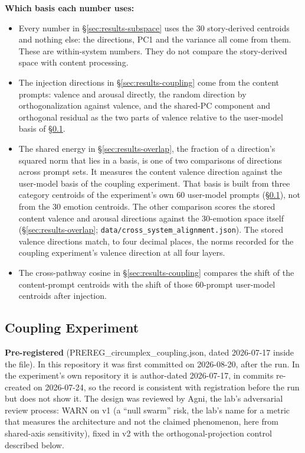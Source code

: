 \documentclass[11pt,a4paper]{article}
\begin{document}
\textbf{Which basis each number uses:}
\begin{itemize}
  \item Every number in \S\ref{sec:results-subspace} uses the 30 story-derived centroids and nothing else: the directions, PC1 and the variance all come from them. These are within-system numbers. They do not compare the story-derived space with content processing.
  \item The injection directions in \S\ref{sec:results-coupling} come from the content prompts: valence and arousal directly, the random direction by orthogonalization against valence, and the shared-PC component and orthogonal residual as the two parts of valence relative to the user-model basis of \S\ref{sec:coupling}.
  \item The shared energy in \S\ref{sec:results-overlap}, the fraction of a direction's squared norm that lies in a basis, is one of two comparisons of directions across prompt sets. It measures the content valence direction against the user-model basis of the coupling experiment. That basis is built from three category centroids of the experiment's own 60 user-model prompts (\S\ref{sec:coupling}), not from the 30 emotion centroids. The other comparison scores the stored content valence and arousal directions against the 30-emotion space itself (\S\ref{sec:results-overlap}; \texttt{data/\allowbreak cross\_system\_alignment.json}). The stored valence directions match, to four decimal places, the norms recorded for the coupling experiment's valence direction at all four layers.
  \item The cross-pathway cosine in \S\ref{sec:results-coupling} compares the shift of the content-prompt centroids with the shift of those 60-prompt user-model centroids after injection.
\end{itemize}

\subsection{Coupling Experiment}
\label{sec:coupling}

\textbf{Pre-registered} (PREREG\_circumplex\_coupling.json, dated 2026-07-17 inside the file). In this repository it was first committed on 2026-08-20, after the run. In the experiment's own repository it is author-dated 2026-07-17, in commits re-created on 2026-07-24, so the record is consistent with registration before the run but does not show it. The design was reviewed by Agni, the lab's adversarial review process: WARN on v1 (a ``null swarm'' risk, the lab's name for a metric that measures the architecture and not the claimed phenomenon, here from shared-axis sensitivity), fixed in v2 with the orthogonal-projection control described below.
\end{document}

